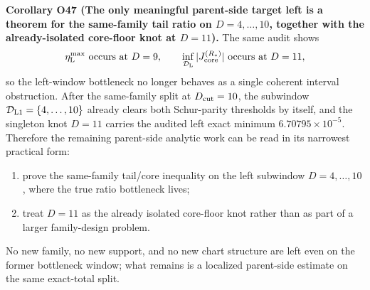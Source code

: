 \documentclass[aps,prd,onecolumn,notitlepage,nofootinbib,superscriptaddress,11pt,floatfix]{revtex4-2}
\begin{document}
\medskip\noindent\textbf{Corollary O47 (The only meaningful parent-side target left is a theorem for the same-family tail ratio on \(D=4,\dots,10\), together with the already-isolated core-floor knot at \(D=11\)).}
The same audit shows
\[
\eta_{\rm L}^{\max}\text{ occurs at }D=9,
\qquad
\inf_{\mathcal D_{\rm L}}|J_{\rm core}^{(R_\ast)}|\text{ occurs at }D=11,
\]
so the left-window bottleneck no longer behaves as a single coherent interval obstruction.  After the same-family split at \(D_{\rm cut}=10\), the subwindow \(\mathcal D_{\rm L1}=\{4,\dots,10\}\) already clears both Schur-parity thresholds by itself, and the singleton knot \(D=11\) carries the audited left exact minimum \(6.70795\times10^{-5}\).  Therefore the remaining parent-side analytic work can be read in its narrowest practical form:

\begin{enumerate}
\item prove the same-family tail/core inequality on the left subwindow \(D=4,\dots,10\), where the true ratio bottleneck lives;
\item treat \(D=11\) as the already isolated core-floor knot rather than as part of a larger family-design problem.
\end{enumerate}

No new family, no new support, and no new chart structure are left even on the former bottleneck window; what remains is a localized parent-side estimate on the same exact-total split.
\end{document}
